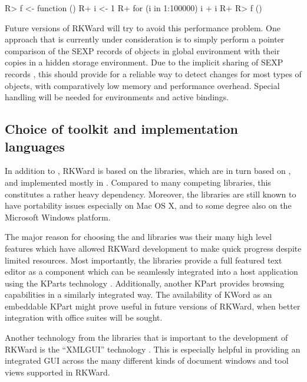 \begin{Code}
R> f <- function () {
R+    i <- 1
R+    for (i in 1:100000) i + i
R+ }
R> f ()
\end{Code}

Future versions of RKWard will try to avoid this performance problem. 
One approach that is currently under consideration is to simply perform
a pointer comparison of the SEXP records of objects in global environment with
their copies in a hidden storage environment. Due to the implicit sharing of
SEXP records \citep{RDCT2010a, RDCT2010b}, this should provide for a reliable
way to detect changes for most types of  objects, with comparatively low memory
and performance overhead. Special handling will be needed for environments and
active bindings.

\subsection{Choice of toolkit and implementation languages}
\label{sec:technical_toolkit}
In addition to , RKWard is based on the  libraries, which are in turn based
on , and implemented mostly in . Compared to many competing libraries,
this constitutes a rather heavy dependency. Moreover, the  libraries are
still known to have portability issues especially on Mac OS X, and to some degree
also on the Microsoft Windows platform.

The major reason for choosing the  and  libraries was their 
many high level features which have allowed RKWard development to make quick
progress despite limited resources. Most importantly, the  libraries provide a
full featured text editor \citep{CullmannND} as a component which can be
seamlessly integrated into a host application using the KParts technology
\citep{Faure2000}. Additionally, another KPart provides  browsing capabilities in a
similarly integrated way. The availability of KWord \citep{KWord} as an
embeddable KPart might prove useful in future versions of RKWard, when better
integration with office suites will be sought.

Another technology from the  libraries that is important to the development
of RKWard is the ``XMLGUI'' technology
\citep{Faure2000}. This is especially helpful in providing an integrated GUI across
the many different kinds of document windows and tool views supported in RKWard.

